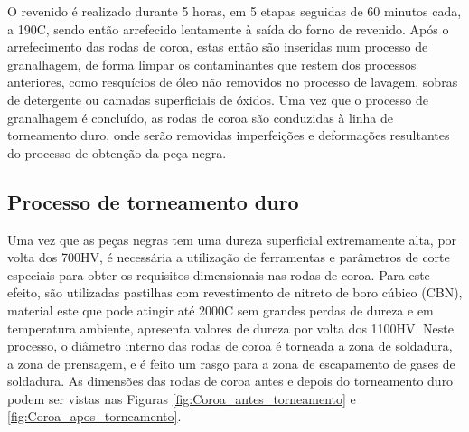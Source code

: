 \par
O revenido é realizado durante 5 horas, em 5 etapas seguidas de 60 minutos cada, a 190\textdegree C, sendo então arrefecido lentamente à saída do forno de revenido. Após o arrefecimento das rodas de coroa, estas então são inseridas num processo de granalhagem, de forma limpar os contaminantes que restem dos processos anteriores, como resquícios de óleo não removidos no processo de lavagem, sobras de detergente ou camadas superficiais de óxidos. Uma vez que o processo de granalhagem é concluído, as rodas de coroa são conduzidas à linha de torneamento duro, onde serão removidas imperfeições e deformações resultantes do processo de obtenção da peça negra.

\subsection{Processo de torneamento duro} \label{ssec:materiais_CS_torneamento}
Uma vez que as peças negras tem uma dureza superficial extremamente alta, por volta dos 700HV, é necessária a utilização de ferramentas e parâmetros de corte especiais para obter os requisitos dimensionais nas rodas de coroa. Para este efeito, são utilizadas pastilhas com revestimento de nitreto de boro cúbico (CBN), material este que pode atingir até 2000\textdegree C sem grandes perdas de dureza e em temperatura ambiente, apresenta valores de dureza por volta dos 1100HV. Neste processo, o diâmetro interno das rodas de coroa é torneada a zona de soldadura, a zona de prensagem, e é feito um rasgo para a zona de escapamento de gases de soldadura. As dimensões das rodas de coroa antes e depois do torneamento duro podem ser vistas nas Figuras \ref{fig:Coroa_antes_torneamento} e \ref{fig:Coroa_apos_torneamento}.
